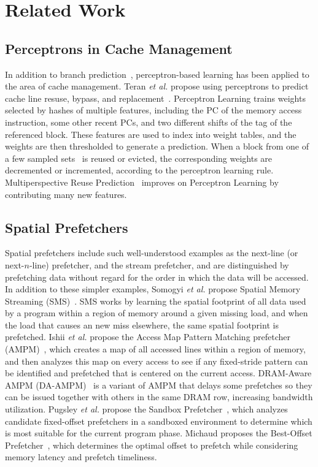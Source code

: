 \section{Related Work}
\label{related}

\subsection{Perceptrons in Cache Management}

In addition to branch prediction~\cite{PerceptronPredictor},
perceptron-based learning has been applied to the area of cache
management.  Teran \textit{et al.} propose using perceptrons to
predict cache line resuse, bypass, and replacement~\cite{Perc_Reuse}.
Perceptron Learning trains weights selected by hashes of multiple
features, including the PC of the memory access instruction, some
other recent PCs, and two different shifts of the tag of the
referenced block. These features are used to index into weight tables,
and the weights are then thresholded to generate a prediction. When a
block from one of a few sampled sets~\cite{sdbp} is reused or evicted,
the corresponding weights are decremented or incremented, according to
the perceptron learning rule. Multiperspective Reuse
Prediction~\cite{Multiperspective} improves on Perceptron Learning by
contributing many new features.

\subsection{Spatial Prefetchers}

Spatial prefetchers include such well-understood examples as the
next-line (or next-$n$-line) prefetcher, and the stream prefetcher,
and are distinguished by prefetching data without regard for the order
in which the data will be accessed.  In addition to these simpler
examples, Somogyi \textit{et al.}  propose Spatial Memory Streaming
(SMS)~\cite{SMS}.  SMS works by learning the spatial footprint of all
data used by a program within a region of memory around a given
missing load, and when the load that causes an new miss elsewhere, the
same spatial footprint is prefetched.  Ishii \textit{et al.} propose
the Access Map Pattern Matching prefetcher (AMPM)~\cite{AMPM}, which
creates a map of all accessed lines within a region of memory, and
then analyzes this map on every access to see if any fixed-stride
pattern can be identified and prefetched that is centered on the
current access. DRAM-Aware AMPM (DA-AMPM)~\cite{DA_AMPM} is a variant
of AMPM that delays some prefetches so they can be issued together
with others in the same DRAM row, increasing bandwidth utilization.
Pugsley \textit{et al.}  propose the Sandbox
Prefetcher~\cite{Sandbox}, which analyzes candidate fixed-offset
prefetchers in a sandboxed environment to determine which is most
suitable for the current program phase.  Michaud proposes the
Best-Offset Prefetcher~\cite{BOP}, which determines the optimal offset
to prefetch while considering memory latency and prefetch timeliness.

